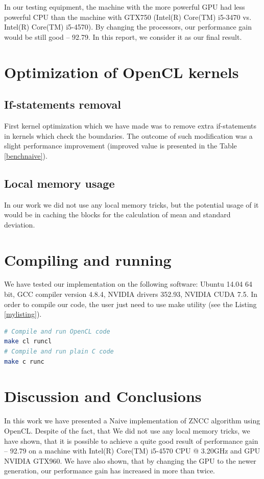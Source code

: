 \documentclass[conference]{IEEEtran}
\begin{document}
In our testing equipment, the machine with the more powerful GPU had less powerful CPU than the machine with GTX750 (Intel(R) Core(TM) i5-3470 vs. Intel(R) Core(TM) i5-4570). By changing the processors, our performance gain would be still good -- 92.79. In this report, we consider it as our final result.

\section{Optimization of OpenCL kernels}\label{sec:Optimization}
\subsection{If-statements removal}
First kernel optimization which we have made was to remove extra if-statements in kernels which check the boundaries. The outcome of such modification was a slight performance improvement (improved value is presented in the Table \ref{benchnaive}).

\subsection{Local memory usage}
In our work we did not use any local memory tricks, but the potential usage of it would be in caching the blocks for the calculation of mean and standard deviation.

\section{Compiling and running}
We have tested our implementation on the following software: Ubuntu 14.04 64 bit, GCC compiler version 4.8.4, NVIDIA drivers 352.93, NVIDIA CUDA 7.5. In order to compile our code, the user just need to use make utility (see the Listing \ref{mylisting}).

\begin{lstlisting}[language=bash,caption={Compiling commands},label={mylisting}]
# Compile and run OpenCL code
make cl runcl
# Compile and run plain C code
make c runc
\end{lstlisting}

\section{Discussion and Conclusions}
In this work we have presented a Naive implementation of ZNCC algorithm using OpenCL. Despite of the fact, that We did not use any local memory tricks, we have shown, that it is possible to  achieve a quite good result of performance gain -- 92.79 on a machine with Intel(R) Core(TM) i5-4570 CPU @ 3.20GHz and GPU NVIDIA GTX960. We have also shown, that by changing the GPU to the newer generation, our performance gain has increased in more than twice.





\end{document}
